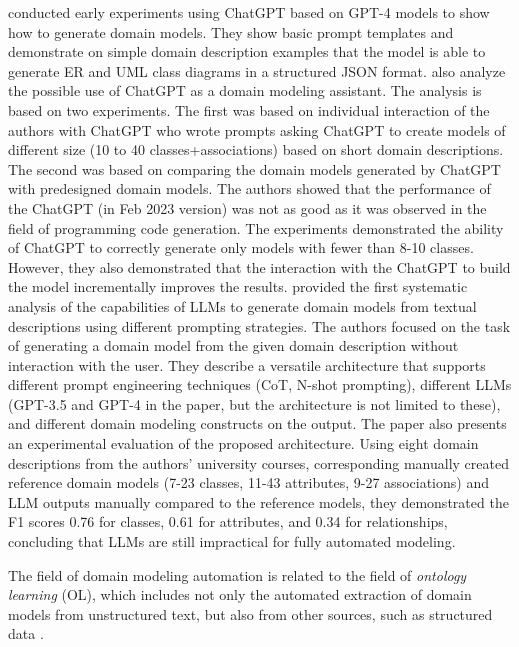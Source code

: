 \citet{Fill2023} conducted early experiments using ChatGPT based on GPT-4 models \cite{Achiam2023} to show how to generate domain models. They show basic prompt templates and demonstrate on simple domain description examples that the model is able to generate ER and UML class diagrams in a structured JSON format.
\citet{Camara2023} also analyze the possible use of ChatGPT as a domain modeling assistant. The analysis is based on two experiments.
The first was based on individual interaction of the authors with ChatGPT who wrote prompts asking ChatGPT to create models of different size (10 to 40 classes+associations) based on short domain descriptions.
The second was based on comparing the domain models generated by ChatGPT with predesigned domain models. The authors showed that the performance of the ChatGPT (in Feb 2023 version) was not as good as it was observed in the field of programming code generation. The experiments demonstrated the ability of ChatGPT to correctly generate only models with fewer than 8-10 classes. However, they also demonstrated that the interaction with the ChatGPT to build the model incrementally improves the results.
\citet{Chen2023} provided the first systematic analysis of the capabilities of LLMs to generate domain models from textual descriptions using different prompting strategies. The authors focused on the task of generating a domain model from the given domain description without interaction with the user. They describe a versatile architecture that supports different prompt engineering techniques (CoT, N-shot prompting), different LLMs (GPT-3.5 and GPT-4 in the paper, but the architecture is not limited to these), and different domain modeling constructs on the output.
The paper also presents an experimental evaluation of the proposed architecture. Using eight domain descriptions from the authors' university courses, corresponding manually created reference domain models (7-23 classes, 11-43 attributes, 9-27 associations) and LLM outputs manually compared to the reference models, they demonstrated the F1 scores 0.76 for classes, 0.61 for attributes, and 0.34 for relationships, concluding that LLMs are still impractical for fully automated modeling.

The field of domain modeling automation is related to the field of \emph{ontology learning} (OL)\cite{Konys2019,Khadir2021}, which includes not only the automated extraction of domain models from unstructured text, but also from other sources, such as structured data \cite{Lakzaei2021}.


